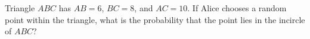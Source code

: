 Triangle $ABC$ has $AB = 6$, $BC = 8$, and $AC = 10$. If Alice chooses a random point within the triangle, what is the probability that the point lies in the incircle of $ABC$?
